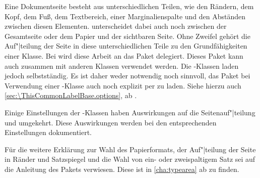 Eine Dokumentseite besteht aus unterschiedlichen Teilen, wie den Rändern, dem
Kopf, dem Fuß, dem Textbereich, einer Marginalienspalte und den Abständen
zwischen diesen Elementen. \KOMAScript{} unterscheidet dabei auch noch
zwischen der Gesamtseite oder dem Papier und der sichtbaren Seite. Ohne
Zweifel gehört die Auf"|teilung der Seite in diese unterschiedlichen Teile zu
den Grundfähigkeiten einer
Klasse. Bei \KOMAScript{}
wird diese Arbeit an das Paket
\hyperref[cha:typearea]{}
delegiert. Dieses Paket kann auch zusammen mit anderen Klassen verwendet
werden. Die \KOMAScript-Klassen laden
\hyperref[cha:typearea]{} jedoch selbstständig. Es ist daher
weder notwendig noch sinnvoll, das Paket bei Verwendung einer
\KOMAScript-Klasse auch noch explizit per  zu laden. Siehe
hierzu auch \autoref{sec:\ThisCommonLabelBase.options}, ab
.

Einige Einstellungen der \KOMAScript{}-Klassen haben Auswirkungen auf die
Seitenauf"|teilung und umgekehrt. Diese Auswirkungen werden bei den
entsprechenden Einstellungen dokumentiert.

Für die weitere Erklärung zur Wahl des Papierformats, der Auf"|teilung der
Seite in Ränder und Satzspiegel und die Wahl von ein- oder zweispaltigem Satz
sei auf die Anleitung des Pakets
\hyperref[cha:typearea]{}
verwiesen. Diese ist in \autoref{cha:typearea} ab 
zu finden.



